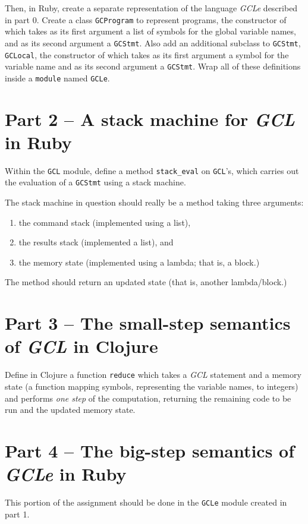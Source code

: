 \documentclass[11pt]{article}
\theoremstyle{definition}
\begin{document}
Then, in Ruby, create a separate representation of
the language \emph{GCLe} described in part 0.
Create a class \texttt{GCProgram} to represent programs,
the constructor of which takes as its first argument
a list of symbols for the global variable names,
and as its second argument a \texttt{GCStmt}.
Also add an additional subclass to \texttt{GCStmt}, \texttt{GCLocal},
the constructor of which takes as its first argument a symbol
for the variable name and as its second argument a \texttt{GCStmt}.
Wrap all of these definitions inside a \texttt{module} named \texttt{GCLe}.

\section*{Part 2 – A stack machine for \emph{GCL} in Ruby}
\label{sec:org58d3b21}
Within the \texttt{GCL} module, define a method \texttt{stack\_eval} on \texttt{GCL}'s,
which carries out the evaluation of a \texttt{GCStmt} using a stack machine.

The stack machine in question should really be a method
taking three arguments:
\begin{enumerate}
\item the command stack (implemented using a list),
\item the results stack (implemented a list), and
\item the memory state (implemented using a lambda; that is, a block.)
\end{enumerate}

The method should return an updated state
(that is, another lambda/block.)

\section*{Part 3 – The small-step semantics of \emph{GCL} in Clojure}
\label{sec:orgad4ee73}
Define in Clojure a function \texttt{reduce} which takes
a \emph{GCL} statement and a memory state
(a function mapping symbols, representing the variable names, to integers)
and performs \emph{one step} of the computation, returning the
remaining code to be run and the updated memory state.

\section*{Part 4 – The big-step semantics of \emph{GCLe} in Ruby}
\label{sec:orgc180894}
This portion of the assignment should be done in
the \texttt{GCLe} module created in part 1.
\end{document}

